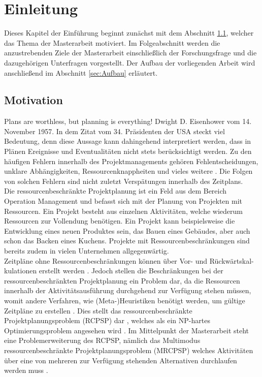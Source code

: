 \chapter{Einleitung} \label{ch:Einleitung}

Dieses Kapitel der Einführung beginnt zunächst mit dem Abschnitt \ref{sec:Motivation}, welcher das Thema der Masterarbeit motiviert. Im Folgeabschnitt werden die anzustrebenden Ziele der Masterarbeit einschließlich der Forschungsfrage und die dazugehörigen Unterfragen vorgestellt. Der Aufbau der vorliegenden Arbeit wird anschließend im Abschnitt \ref{sec:Aufbau} erläutert.

\section{Motivation} \label{sec:Motivation}

\glqq Plans are worthless, but planning is everything!\grqq{} \cite[S. 235]{eisenhower_dwight_1958} Dwight D. Eisenhower vom 14. November 1957. In dem Zitat vom 34. Präsidenten der USA steckt viel Bedeutung, denn diese Aussage kann dahingehend interpretiert werden, dass in Plänen Ereignisse und Eventualitäten nicht stets berücksichtigt werden. Zu den häufigen Fehlern innerhalb des Projektmanagements gehören Fehlentscheidungen, unklare Abhängigkeiten, Ressourcenknappheiten und vieles weitere \cite[vgl.][S. 74]{nelson_it_2007}. Die Folgen von solchen Fehlern sind nicht zuletzt Verspätungen innerhalb des Zeitplans.  \\

Die ressourcenbeschränkte Projektplanung ist ein Feld aus dem Bereich Operation Management und befasst sich mit der Planung von Projekten mit Ressourcen. Ein Projekt besteht aus einzelnen Aktivitäten, welche wiederum Ressourcen zur Vollendung benötigen. Ein Projekt kann beispielsweise die Entwicklung eines neuen Produktes sein, das Bauen eines Gebäudes, aber auch schon das Backen eines Kuchens. Projekte mit Ressourcenbeschränkungen sind bereits zudem in vielen Unternehmen allgegenwärtig. \cite[vgl.][S. 1 f.]{kellenbrink_ressourcenbeschrankte_2014} \\

Zeitpläne ohne Ressourcenbeschränkungen können über Vor- und Rückwärtskal-kulationen erstellt werden \cite[vgl.][S. 9 f.]{kellenbrink_ressourcenbeschrankte_2014}. Jedoch stellen die Beschränkungen bei der ressourcenbeschränkten Projektplanung ein Problem dar, da die Ressourcen innerhalb der Aktivitätsausführung durchgehend zur Verfügung stehen müssen, womit andere Verfahren, wie (Meta-)Heuristiken benötigt werden, um gültige Zeitpläne zu erstellen \cite[vgl.][S. 11]{kellenbrink_ressourcenbeschrankte_2014}. Dies stellt das ressourcenbeschränkte Projektplanungsproblem (RCPSP) dar \cite[vgl.][S. 11]{kellenbrink_ressourcenbeschrankte_2014}, welches als ein NP-hartes Optimierungsproblem angesehen wird \cite[vgl.][S. 2]{kolisch_heuristic_1998}. Im Mittelpunkt der Masterarbeit steht eine Problemerweiterung des RCPSP, nämlich das Multimodus ressourcenbeschränkte Projektplanungsproblem (MRCPSP) welches Aktivitäten über eine von mehreren zur Verfügung stehenden Alternativen durchlaufen werden muss \cite[vgl.][S. 596]{wuliang_improved_2014}. \\


